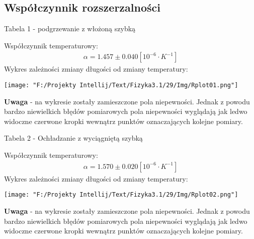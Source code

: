 \documentclass[11pt]{article}
\begin{document}
    \subsection*{Współczynnik rozszerzalności}
    \begin{center}
        Tabela 1 - podgrzewanie z włożoną szybką
    \end{center}
    \begin{center}
    \end{center}
    Współczynnik temperaturowy:
    \begin{gather*}
        \alpha=1.457\pm 0.040 [10^{-6}\cdot K^{-1}]
    \end{gather*}
    Wykres zależności zmiany długości od zmiany temperatury:
    \begin{center}
        \texttt{[image: "F:/Projekty Intellij/Text/Fizyka3.1/29/Img/Rplot01.png"]}
    \end{center}
    \textbf{Uwaga} - na wykresie zostały zamieszczone pola niepewności. Jednak z powodu bardzo niewielkich błędów pomiarowych
    pola niepewności wyglądają jak ledwo widoczne czerwone kropki wewnątrz punktów oznaczających kolejne pomiary.
    \\
    \begin{center}
        Tabela 2 - Ochładzanie z wyciągniętą szybką
    \end{center}
    \begin{center}
    \end{center}
    Współczynnik temperaturowy:
    \begin{gather*}
        \alpha=1.570\pm 0.020[10^{-6}\cdot K^{-1}]
    \end{gather*}
    Wykres zależności zmiany długości od zmiany temperatury:
    \begin{center}
        \texttt{[image: "F:/Projekty Intellij/Text/Fizyka3.1/29/Img/Rplot02.png"]}
    \end{center}
    \textbf{Uwaga} - na wykresie zostały zamieszczone pola niepewności. Jednak z powodu bardzo niewielkich błędów pomiarowych
    pola niepewności wyglądają jak ledwo widoczne czerwone kropki wewnątrz punktów oznaczających kolejne pomiary.
    
\end{document}
